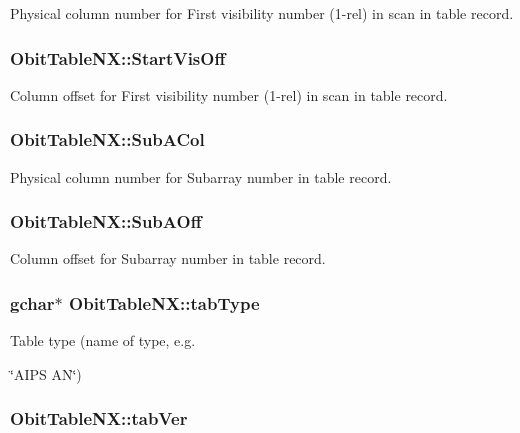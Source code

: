 Physical column number for First visibility number (1-rel) in scan in table record. 

\subsubsection{ {\bf Obit\-Table\-NX::Start\-Vis\-Off}}\label{structObitTableNX_o23}


Column offset for First visibility number (1-rel) in scan in table record. 

\subsubsection{ {\bf Obit\-Table\-NX::Sub\-ACol}}\label{structObitTableNX_o22}


Physical column number for Subarray number in table record. 

\subsubsection{ {\bf Obit\-Table\-NX::Sub\-AOff}}\label{structObitTableNX_o21}


Column offset for Subarray number in table record. 

\subsubsection{\setlength{\rightskip}{0pt plus 5cm}gchar$\ast$ {\bf Obit\-Table\-NX::tab\-Type}}\label{structObitTableNX_o12}


Table type (name of type, e.g. 

\char`\"{}AIPS AN\char`\"{}) 
\subsubsection{ {\bf Obit\-Table\-NX::tab\-Ver}}\label{structObitTableNX_o13}



